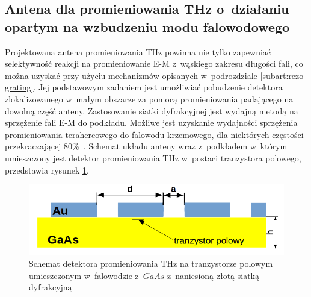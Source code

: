 \subsection{Antena dla promieniowania THz o~działaniu opartym na wzbudzeniu modu falowodowego}
\label{subart:antenaThz}
Projektowana antena promieniowania THz powinna nie tylko zapewniać selektywność reakcji na promieniowanie E-M z~wąskiego zakresu długości fali, co można uzyskać przy użyciu mechanizmów opisanych w~podrozdziale \ref{subart:rezo-grating}. Jej podstawowym zadaniem jest umożliwiać pobudzenie detektora zlokalizowanego w~małym obszarze za pomocą promieniowania padającego na dowolną część anteny. Zastosowanie siatki dyfrakcyjnej jest wydajną metodą na sprzężenie fali E-M do podkładu. Możliwe jest uzyskanie wydajności sprzężenia promieniowania terahercowego do falowodu krzemowego, dla niektórych częstości przekraczającej 80\%~\cite{roux2002grating}.  Schemat układu anteny wraz z~podkładem w~którym umieszczony jest detektor promieniowania THz w~postaci tranzystora polowego, przedstawia rysunek \ref{fig:schem-podklad-falo}.
\begin{figure}[tb]
	\centering
	\includegraphics[width=\textwidth]{images/thz/schemat-podklad-falo.png}
	\caption{Schemat detektora promieniowania THz na tranzystorze polowym umieszczonym w~falowodzie z~$GaAs$ z~naniesioną złotą siatką dyfrakcyjną}
	\label{fig:schem-podklad-falo}
\end{figure}

